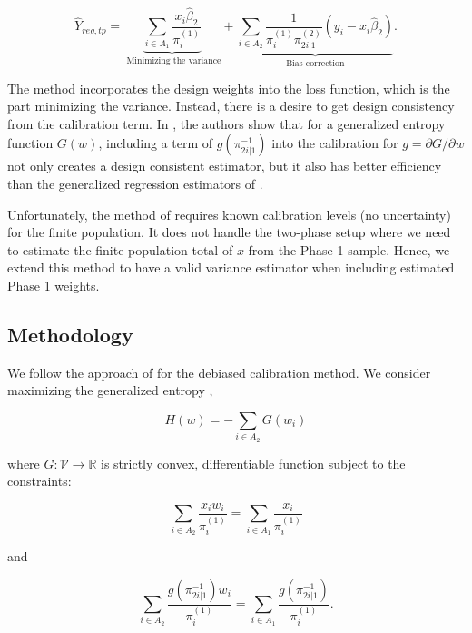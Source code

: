 \documentclass[12pt]{article}
\newcommand{\R}{\mathbb{R}}
\begin{document}
$$ \hat Y_{reg, tp} 
= \underbrace{\sum_{i \in A_1} \frac{x_i \hat \beta_2}{\pi_i^{(1)}}}_{
  \text{ Minimizing the variance}} + \underbrace{\sum_{i \in A_2}
\frac{1}{\pi_i^{(1)}\pi_{2i|1}^{(2)}} (y_i - x_i \hat \beta_2)}_{
\text{Bias correction}}.$$

The \cite{deville1992calibration} method incorporates the design weights into
the loss function, which is the part minimizing the variance. Instead, there is
a desire to get design consistency from the calibration term. In 
\cite{kwon2024debiased}, the authors show that for a generalized entropy
function $G(w)$, including a term of $g(\pi_{2i|1}^{-1})$ into the calibration
for $g = \partial G / \partial w$ not only creates a design consistent
estimator, but it also has better efficiency than the generalized regression
estimators of \cite{deville1992calibration}.

Unfortunately, the method of \cite{kwon2024debiased} requires known calibration
levels (no uncertainty) for the finite population. It does not handle the
two-phase setup where we need to estimate the finite population total of $x$
from the Phase 1 sample. Hence, we extend this method to have a valid variance 
estimator when including estimated Phase 1 weights.

\subsection*{Methodology}

We follow the approach of \cite{kwon2024debiased} for the debiased calibration
method. We consider maximizing the generalized entropy \cite{gneiting2007strictly},

\begin{equation}\label{eq:primalloss}
H(w) = - \sum_{i \in A_2} G(w_i)
\end{equation}

where $G: \mathcal{V} \to \R$ is strictly convex, differentiable function
subject to the constraints:

\begin{equation}\label{eq:calconst1}
\sum_{i \in A_2} \frac{x_i w_i}{\pi_i^{(1)}} = 
\sum_{i \in A_1} \frac{x_i}{\pi_i^{(1)}}
\end{equation}

and 

\begin{equation}\label{eq:calconst2}
\sum_{i \in A_2} \frac{g(\pi_{2i|1}^{-1})w_i}{\pi_i^{(1)}} = 
\sum_{i \in A_1} \frac{g(\pi_{2i|1}^{-1})}{\pi_i^{(1)}}.
\end{equation}
\end{document}
